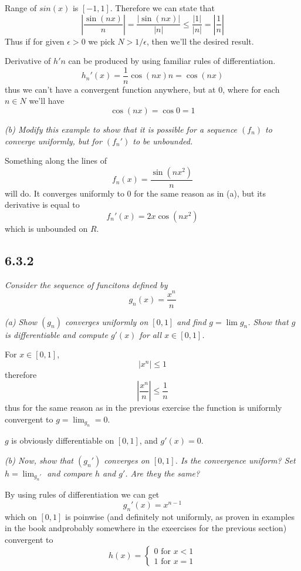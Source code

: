 \documentclass[11pt,oneside,titlepage]{book}
\begin{document}
Range of $sin(x)$ is $[-1, 1]$. Therefore we can state that
$$\left|\frac{\sin{(nx)}}{n}\right| = \frac{|\sin{(nx)}|}{|n|}
\leq \frac{|1|}{|n|} = \left|\frac{1}{n}\right|$$
Thus if for given $\epsilon > 0$ we pick $N >  1/\epsilon$, then we'll
the desired result.

Derivative of $h'n$ can be produced by using familiar rules of differentiation.
$$h_n'(x) = \frac{1}{n}\cos{(nx)}n = \cos{(nx)}$$
thus we can't have a convergent function anywhere, but at $0$, where
for each $n \in N$ we'll have
$$\cos{(nx)} = \cos{0} = 1$$

\textit{(b) Modify this example to show that it is possible for a sequence
  $(f_n)$ to converge uniformly, but for $(f_n')$ to be unbounded.}

Something along the lines of
$$f_n(x) = \frac{\sin{(n x^2)}}{n}$$
will do. It converges uniformly to $0$ for the same reason as in (a), but
its derivative is equal to
$$f_n'(x) = 2x \cos{(n x^2)}$$
which is unbounded on $R$.

\subsection*{6.3.2}
\textit{Consider the sequence of funcitons defined by }
$$g_n(x) = \frac{x^n}{n}$$

\textit{(a) Show $(g_n)$ converges uniformly on $[0, 1]$ and find
  $g = \lim{g_n}$. Show that $g$ is differentiable and compute $g'(x)$
  for all $x \in [0, 1]$.}

For $x \in [0, 1]$,
$$|x^n| \leq 1$$
therefore
$$\left|\frac{x^n}{n}\right| \leq \frac{1}{n}$$
thus for the same reason as in the previous exercise the function is
uniformly convergent to $g = \lim_{g_n} = 0$.

$g$ is obviously differentiable on $[0, 1]$, and $g'(x) = 0$.

\textit{(b) Now, show that $(g_n')$ converges on $[0, 1]$. Is the convergence
uniform? Set $h = \lim_{g_n'}$ and compare $h$ and $g'$. Are they the same?}

By using rules of differentiation we can get
$$g_n'(x) = x^{n - 1}$$
which on $[0, 1]$ is poinwise (and definitely not uniformly, as proven in
examples in the book andprobably somewhere in the exeercises for the previous
section) convergent to
$$h(x) =
\begin{cases}
  0 \text{ for } x < 1 \\
  1 \text{ for } x = 1
\end{cases}
$$
\end{document}
